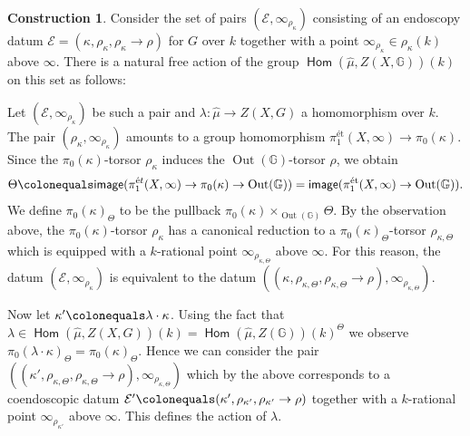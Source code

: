 \documentclass{article}
\DeclareMathOperator{\Hom}{\mathsf{Hom}}
\newcommand{\Gb}{\mathbb{G}}
\DeclareMathOperator{\Tb}{\mathbb{T}}
\newcommand{\CE}{{\mathcal E}}
\DeclareMathOperator{\Out}{Out}
\newcommand{\defeq}{\colonequals}
\theoremstyle{definition}
\newtheorem{construction}[definition]{Construction}
\theoremstyle{plain}
\begin{document}
\begin{construction}\label{const:coend_action}
Consider the set of pairs $(\CE,\infty_{\rho_\kappa})$ consisting of an endoscopy datum $\CE=(\kappa,\rho_\kappa,\rho_\kappa \to \rho)$ for $G$ over $k$ together with a point $\infty_{\rho_\kappa} \in \rho_{\kappa}(k)$ above $\infty$. There is a natural free action of the group $\Hom(\widehat{\mu},Z(X,\Gb))(k)$ on this set as follows: 

Let $(\CE,\infty_{\rho_\kappa})$ be such a pair and $\lambda\colon \widehat\mu \to Z(X,G)$ a homomorphism over $k$. The pair $(\rho_\kappa,\infty_{\rho_\kappa})$ amounts to a group homomorphism $\pi_1^{\text{\'et}}(X,\infty) \to \pi_0(\kappa)$. Since the $\pi_0(\kappa)$-torsor $\rho_{\kappa}$ induces the $\Out(\Gb)$-torsor $\rho$, we obtain
$$\Theta \defeq \mathsf{image}(\pi_1^{\text{\'e}t}(X,\infty) \to \pi_0(\kappa) \to \Out(\Gb)) = \mathsf{image}(\pi_1^{\text{\'et}}(X,\infty) \to \Out(\Gb)) .$$
We define $\pi_0(\kappa)_{\Theta}$ to be the pullback $\pi_0(\kappa) \times_{\Out(\Gb)} \Theta$. By the observation above, the $\pi_0(\kappa)$-torsor $\rho_{\kappa}$ has a canonical reduction to a $\pi_0(\kappa)_{\Theta}$-torsor $\rho_{\kappa,\Theta}$ which is equipped with a $k$-rational point $\infty_{\rho_{\kappa,\Theta}}$ above $\infty$. For this reason, the datum $(\CE,\infty_{\rho_\kappa})$ is equivalent to the datum $((\kappa,\rho_{\kappa,\Theta},\rho_{\kappa,\Theta}\to \rho),\infty_{\rho_{\kappa,\Theta}})$.

Now let $\kappa'\defeq \lambda \cdot \kappa$. Using the fact that $\lambda \in \Hom(\widehat{\mu},Z(X,G))(k) = \Hom(\widehat{\mu},Z(\Gb))(k)^{\Theta}$ we observe $\pi_0(\lambda\cdot{} \kappa)_{\Theta} = \pi_0(\kappa)_{\Theta}$. Hence we can consider the pair $((\kappa', \rho_{\kappa,\Theta},\rho_{\kappa,\Theta} \to \rho),\infty_{\rho_{\kappa,\Theta}})$ which by the above corresponds to a coendoscopic datum $\CE'\defeq (\kappa',\rho_{\kappa'},\rho_{\kappa'}\to \rho)$ together with a $k$-rational point $\infty_{\rho_{\kappa'}}$ above $\infty$. This defines the action of $\lambda$.




\end{construction}
\end{document}
